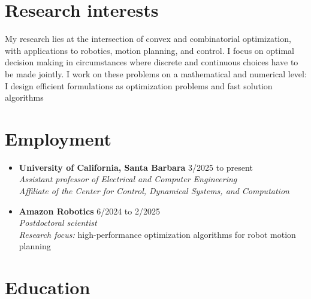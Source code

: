 \documentclass[11pt,a4paper,sans]{moderncv}
\begin{document}
\makecvtitle

\section{Research interests}

My research lies at the intersection of convex and combinatorial optimization, with applications to robotics, motion planning, and control.
I focus on optimal decision making in circumstances where discrete and continuous choices have to be made jointly.
I work on these problems on a mathematical and numerical level: I design efficient formulations as optimization problems and fast solution algorithms

\section{Employment}

\begin{itemize}


\item \textbf{University of California, Santa Barbara} \hfill 3/2025 to present \\
\textit{Assistant professor of Electrical and Computer Engineering} \\
\textit{Affiliate of the Center for Control, Dynamical Systems, and Computation}

\item \textbf{Amazon Robotics} \hfill 6/2024 to 2/2025 \\
\textit{Postdoctoral scientist} \\
\textit{Research focus:} high-performance optimization algorithms for robot motion planning

\end{itemize}

\section{Education}
\end{document}
